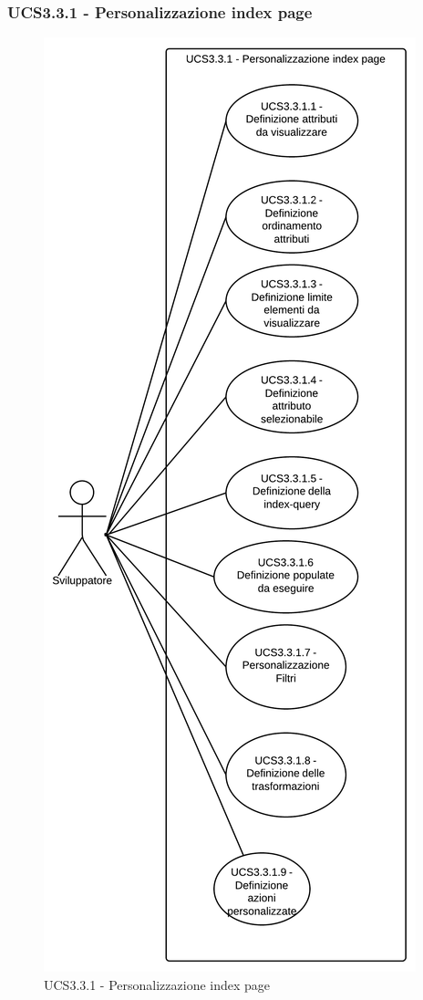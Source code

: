 \subsubsection{UCS3.3.1 - Personalizzazione index page} 
    \begin{center}
    \begin{figure}[H]
      \includegraphics[scale=0.16]{UML/UCS3.3.1 - Personalizzazione index page.png}
      \caption{UCS3.3.1 - Personalizzazione index page} 
    \end{figure}
    \end{center}
    
